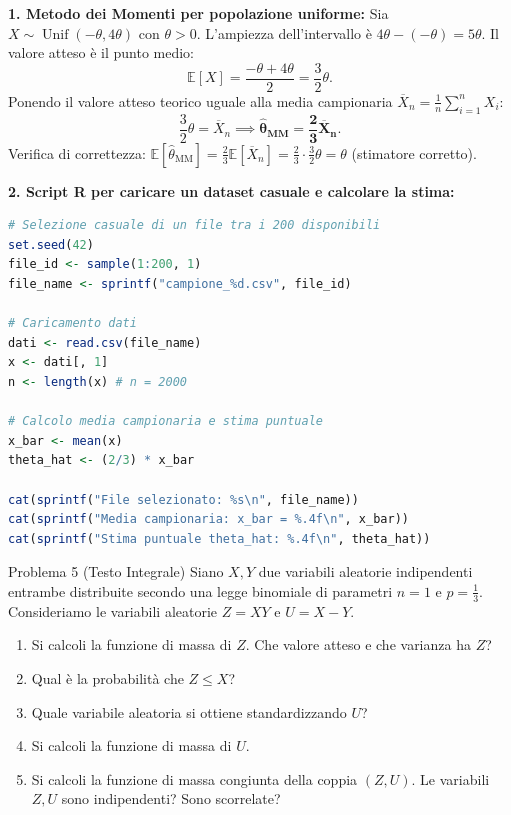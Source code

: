 \documentclass[11pt,a4paper]{article}
\newcommand{\EE}{\mathbb{E}}
\begin{document}
\begin{soluzionebox}
\textbf{1. Metodo dei Momenti per popolazione uniforme:}
Sia $X \sim \operatorname{Unif}(-\theta, 4\theta)$ con $\theta > 0$.
L'ampiezza dell'intervallo è $4\theta - (-\theta) = 5\theta$. Il valore atteso è il punto medio:
\[
\EE[X] = \frac{-\theta + 4\theta}{2} = \frac{3}{2}\theta.
\]
Ponendo il valore atteso teorico uguale alla media campionaria $\overline{X}_n = \frac{1}{n}\sum_{i=1}^n X_i$:
\[
\frac{3}{2}\theta = \overline{X}_n \implies \bm{\widehat{\theta}_{\text{MM}} = \frac{2}{3}\overline{X}_n}.
\]
Verifica di correttezza: $\EE[\widehat{\theta}_{\text{MM}}] = \frac{2}{3}\EE[\overline{X}_n] = \frac{2}{3} \cdot \frac{3}{2}\theta = \theta$ (stimatore corretto).

\textbf{2. Script R per caricare un dataset casuale e calcolare la stima:}
\begin{lstlisting}[language=R]
# Selezione casuale di un file tra i 200 disponibili
set.seed(42)
file_id <- sample(1:200, 1)
file_name <- sprintf("campione_%d.csv", file_id)

# Caricamento dati
dati <- read.csv(file_name)
x <- dati[, 1]
n <- length(x) # n = 2000

# Calcolo media campionaria e stima puntuale
x_bar <- mean(x)
theta_hat <- (2/3) * x_bar

cat(sprintf("File selezionato: %s\n", file_name))
cat(sprintf("Media campionaria: x_bar = %.4f\n", x_bar))
cat(sprintf("Stima puntuale theta_hat: %.4f\n", theta_hat))
\end{lstlisting}
\end{soluzionebox}

\begin{problemabox}{Problema 5 (Testo Integrale)}
Siano $X,Y$ due variabili aleatorie indipendenti entrambe distribuite secondo una legge binomiale di parametri $n=1$ e $p=\frac{1}{3}$. Consideriamo le variabili aleatorie $Z=XY$ e $U=X-Y$.
\begin{enumerate}[label=(\roman*)]
    \item Si calcoli la funzione di massa di $Z$. Che valore atteso e che varianza ha $Z$?
    \item Qual è la probabilità che $Z \le X$?
    \item Quale variabile aleatoria si ottiene standardizzando $U$?
    \item Si calcoli la funzione di massa di $U$.
    \item Si calcoli la funzione di massa congiunta della coppia $(Z,U)$. Le variabili $Z,U$ sono indipendenti? Sono scorrelate?
\end{enumerate}
\end{problemabox}
\end{document}

